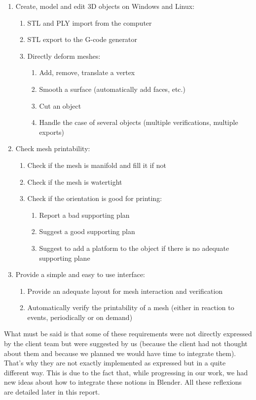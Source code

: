 \documentclass{report}
\begin{document}
\begin{enumerate}
	\item Create, model and edit 3D objects on Windows and Linux:
	\begin{enumerate}
		\item STL and PLY import from the computer
		\item STL export to the G-code generator
		\item Directly deform meshes:
		\begin{enumerate}
			\item Add, remove, translate a vertex
			\item Smooth a surface (automatically add faces, etc.)
			\item Cut an object
			\item Handle the case of several objects (multiple verifications, multiple exports)
		\end{enumerate}
	\end{enumerate}
	\item{Check mesh printability:}
	\begin{enumerate}
		\item Check if the mesh is manifold and fill it if not
		\item Check if the mesh is watertight
		\item Check if the orientation is good for printing:
		\begin{enumerate}
			\item Report a bad supporting plan
			\item Suggest a good supporting plan
			\item Suggest to add a platform to the object if there is no adequate supporting plane
		\end{enumerate}
	\end{enumerate}
	\item{Provide a simple and easy to use interface:}
	\begin{enumerate}
		\item Provide an adequate layout for mesh interaction and verification
		\item Automatically verify the printability of a mesh (either in reaction to events, periodically or on demand)
	\end{enumerate}
\end{enumerate}

\bigskip

What must be said is that some of these requirements were not directly expressed by the client team but were suggested by us (because the client had not thought about them and because we planned we would have time to integrate them). That's why they are not exactly implemented as expressed but in a quite different way. This is due to the fact that, while progressing in our work, we had new ideas about how to integrate these notions in Blender. All these reflexions are detailed later in this report.
\end{document}
